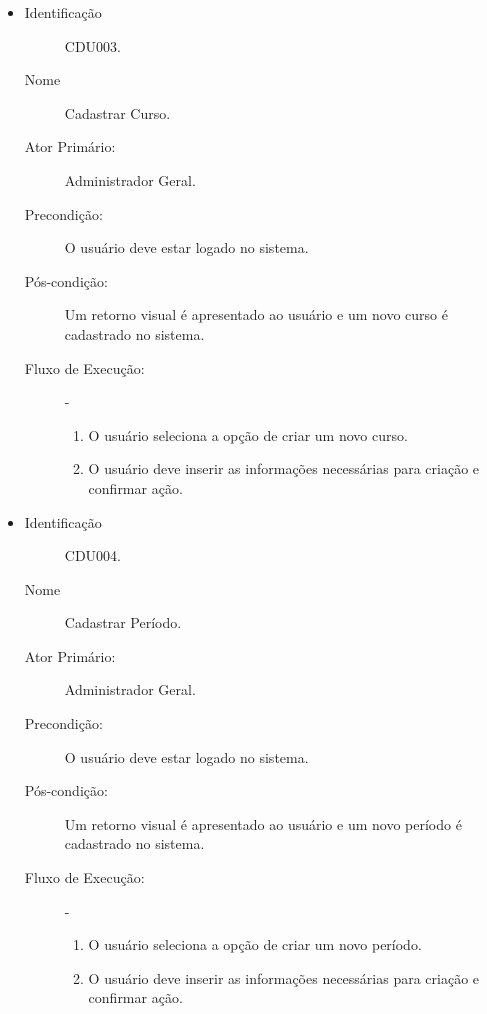 \begin{itemize}
    \vspace{10pt}

    \item       
        \begin{description}
           \item[Identificação] CDU003.
           \item[Nome] Cadastrar Curso.
           \item[Ator Primário:] Administrador Geral.
           \item[Precondição:] O usuário deve estar logado no sistema. 
           \item[Pós-condição:] Um retorno visual é apresentado ao usuário e um novo curso é cadastrado no sistema.
           \item[Fluxo de Execução:] - 
                \begin{enumerate}
                    \item O usuário seleciona a opção de criar um novo curso.
                    \item O usuário deve inserir as informações necessárias para criação e confirmar ação.
                \end{enumerate}
        \end{description}

     \vspace{10pt}
    
    \item 
        \begin{description}
            \item[Identificação] CDU004.
           \item[Nome] Cadastrar Período.
           \item[Ator Primário:] Administrador Geral.
           \item[Precondição:] O usuário deve estar logado no sistema. 
           \item[Pós-condição:] Um retorno visual é apresentado ao usuário e um novo período é cadastrado no sistema.
           \item[Fluxo de Execução:] - 
                \begin{enumerate}
                    \item O usuário seleciona a opção de criar um novo período.
                    \item O usuário deve inserir as informações necessárias para criação e confirmar ação.
                \end{enumerate}
        \end{description}


\end{itemize}

